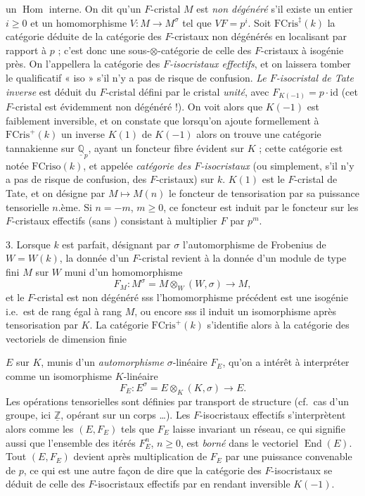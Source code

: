 \documentclass[11pt,a4paper]{article}
\begin{document}
un \emph{$\operatorname{Hom}$} interne. On dit qu'un $F$-cristal $M$ est
\emph{non dégénéré} s'il existe un entier $i \geq 0$ et un
homomorphisme $V : M \to M^{\sigma}$ tel que $VF = p^{i}$. Soit
$\mathrm{FCris}^{\ddagger}(k)$ la catégorie \struck{\ill{}} déduite de la
catégorie des \struck{\ill{}} $F$-cristaux non dégénérés en localisant par
rapport à $p$ ; c'est donc une sous-$\otimes$-catégorie de celle des
$F$-cristaux à isogénie près. On l'appellera la catégorie des
\emph{$F$-isocristaux effectifs}, et on laissera tomber le qualificatif
« iso » s'il n'y a pas de risque de confusion.
\emph{Le $F$-isocristal de Tate inverse}  est déduit du
$F$-cristal défini par le cristal \emph{unité}, avec
$F_{K(-1)} = p\cdot\mathrm{id}$  (cet $F$-cristal est évidemment
non dégénéré !). On voit alors que $K(-1)$ est faiblement inversible, et on
constate que lorsqu'on ajoute formellement à $\mathrm{FCris}^{+}(k)$
\struck{\ill{}} un inverse $K(1)$ de $K(-1)$ alors on trouve une catégorie
tannakienne sur $\underline{\mathbb{Q}}_{p}$, ayant un foncteur fibre évident
sur $K$ ; cette catégorie est notée $\mathrm{FCriso}(k)$, et appelée
\emph{catégorie des $F$-isocristaux} (ou simplement, s'il n'y a
 pas de risque de confusion, des $F$-cristaux) sur $k$. $K(1)$
est le $F$-cristal de Tate, et on désigne par $M \mapsto M(n)$ le foncteur
de tensorisation par sa puissance tensorielle $n$.ème. Si $n = -m$,
$m \geq 0$, ce foncteur est induit par le foncteur sur les $F$-cristaux
effectifs (sans ) consistant à multiplier $F$ par $p^{m}$.

3. \quad Lorsque $k$ est parfait, désignant par $\sigma$ l'automorphisme de
Frobenius de $W = W(k)$, la donnée d'un $F$-cristal revient à la donnée d'un
module de type fini $M$ sur $W$ muni d'un homomorphisme
\[
F_{M} : M^{\sigma} = M \otimes_{W} (W, \sigma) \longrightarrow M ,
\]
et le $F$-cristal est non dégénéré sss l'homomorphisme précédent est une
isogénie i.e.\ est de rang égal à rang $M$, ou encore sss il induit un
isomorphisme après tensorisation par $K$. La catégorie
$\mathrm{FCris}^{+}(k)$ s'identifie alors à la catégorie des vectoriels de
dimension finie

$E$ sur $K$, munis d'un \emph{automorphisme} $\sigma$-linéaire $F_{E}$,
qu'on a intérêt à interpréter comme un isomorphisme $K$-linéaire
\[
F_{E} : E^{\sigma} = E \otimes_{K} (K, \sigma) \longrightarrow E .
\]
Les opérations tensorielles sont définies par transport de structure (cf.\ cas
d'un groupe, ici $\underline{\mathbb{Z}}$, opérant sur un corps …). Les
$F$-isocristaux effectifs s'interprètent alors comme les $(E, F_{E})$ tels que
$F_{E}$ laisse invariant un réseau, ce qui signifie aussi que l'ensemble des
itérés $F_{E}^{n}$, $n \geq 0$, est \emph{borné} dans le vectoriel
$\operatorname{End}(E)$. Tout $(E, F_{E})$ devient 
 après multiplication de $F_{E}$ par une puissance
convenable de $p$, ce qui est une autre façon de dire que la catégorie des
$F$-isocristaux se déduit de celle des $F$-isocristaux effectifs par en
rendant inversible $K(-1)$.
\end{document}
